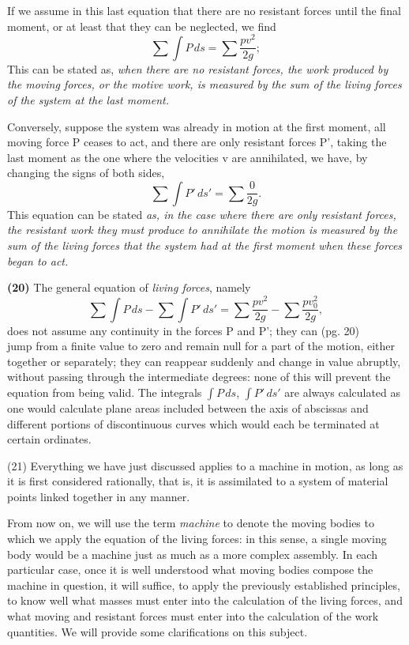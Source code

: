 \documentclass{book}
\begin{document}
If we assume in this last equation that there are no resistant forces until the final moment, or at least that they can be neglected, we find
\[\sum \int P \, ds = \sum \frac{pv^2}{2g} ;\]
This can be stated as, \textit{when there are no resistant forces, the work produced by the moving forces, or the motive work, is measured by the sum of the living forces of the system at the last moment.}

Conversely, suppose the system was already in motion at the first moment, all moving force P ceases to act, and there are only resistant forces P', taking the last moment as the one where the velocities v are annihilated, we have, by changing the signs of both sides,
\[\sum \int P' \, ds' = \sum \frac{0}{2g} .\]
This equation can be stated \textit{as, in the case where there are only resistant forces, the resistant work they must produce to annihilate the motion is measured by the sum of the \textit{living forces} that the system had at the first moment when these forces began to act.}

\textbf{(20)} The general equation of \textit{living forces}, namely
\[\sum \int P \, ds - \sum \int P' \, ds' = \sum \frac{pv^2}{2g} - \sum \frac{pv_0^2}{2g},\]
does not assume any continuity in the forces P and P'; they can 
\newpage
(pg. 20)\\
jump from a finite value to zero and remain null for a part of the motion, either together or separately; they can reappear suddenly and change in value abruptly, without passing through the intermediate degrees: none of this will prevent the equation from being valid. The integrals \(\int P \, ds\), \(\int P' \, ds'\) are always calculated as one would calculate plane areas included between the axis of abscissas and different portions of discontinuous curves which would each be terminated at certain ordinates.

(21) Everything we have just discussed applies to a machine in motion, as long as it is first considered rationally, that is, it is assimilated to a system of material points linked together in any manner.

From now on, we will use the term \textit{machine} to denote the moving bodies to which we apply the equation of the living forces: in this sense, a single moving body would be a machine just as much as a more complex assembly. In each particular case, once it is well understood what moving bodies compose the machine in question, it will suffice, to apply the previously established principles, to know well what masses must enter into the calculation of the living forces, and what moving and resistant forces must enter into the calculation of the work quantities. We will provide some clarifications on this subject.
\end{document}
